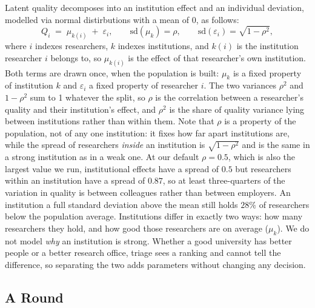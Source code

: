 \documentclass[11pt,a4paper]{article}
\begin{document}
Latent quality decomposes into an institution effect and an individual deviation, modelled via normal distirbutions with a mean of 0, as follows:
\[
Q_i \;=\; \mu_{k(i)} \;+\; \varepsilon_i,
\qquad
\mathrm{sd}(\mu_k) = \rho, \qquad \mathrm{sd}(\varepsilon_i) = \sqrt{1-\rho^2},
\]
where $i$ indexes researchers, $k$ indexes institutions, and $k(i)$ is the
institution researcher $i$ belongs to, so $\mu_{k(i)}$ is the effect of that
researcher's own institution. Both terms are drawn once, when the population is
built: $\mu_k$ is a fixed property of institution $k$ and $\varepsilon_i$ a fixed
property of researcher $i$. %
The two variances $\rho^2$ and $1-\rho^2$ sum to 1 whatever the split, so $\rho$
is the correlation between a researcher's quality and their institution's effect,
and $\rho^2$ is the share of quality variance lying between institutions rather
than within them. Note that $\rho$ is a property of the population, not of any one
institution: it fixes how far apart institutions are, while the spread of
researchers \emph{inside} an institution is $\sqrt{1-\rho^2}$ and is the same in a
strong institution as in a weak one. At our default $\rho = 0.5$, which is also
the largest value we run, institutional effects have a spread of $0.5$ but
researchers within an institution have a spread of $0.87$, so at least
three-quarters of the variation in quality is between colleagues rather than
between employers. An institution a full standard deviation above the mean still
holds $28\%$ of researchers below the population average. Institutions
differ in exactly two ways: how many researchers they hold, and how good those
researchers are on average ($\mu_k$). We do not model \emph{why} an institution
is strong. Whether a good university has better people or a better research
office, triage sees a ranking and cannot tell the difference, so separating the
two adds parameters without changing any decision.

\subsection{A Round}
\label{sec:round}
\end{document}
